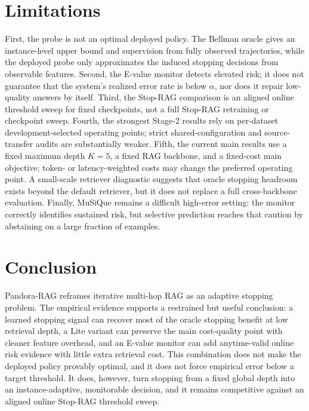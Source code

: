 \documentclass{article}
\newcommand{\method}{Pandora-RAG}
\newcommand{\musique}{MuSiQue}
\begin{document}
\section{Limitations}
\label{sec:limitations}

First, the probe is not an optimal deployed policy. The Bellman oracle gives an instance-level upper bound and supervision from fully observed trajectories, while the deployed probe only approximates the induced stopping decisions from observable features. Second, the E-value monitor detects elevated risk; it does not guarantee that the system's realized error rate is below $\alpha$, nor does it repair low-quality answers by itself. Third, the Stop-RAG comparison is an aligned online threshold sweep for fixed checkpoints, not a full Stop-RAG retraining or checkpoint sweep. Fourth, the strongest Stage-2 results rely on per-dataset development-selected operating points; strict shared-configuration and source-transfer audits are substantially weaker. Fifth, the current main results use a fixed maximum depth $K=5$, a fixed RAG backbone, and a fixed-cost main objective; token- or latency-weighted costs may change the preferred operating point. A small-scale retriever diagnostic suggests that oracle stopping headroom exists beyond the default retriever, but it does not replace a full cross-backbone evaluation. Finally, \musique{} remains a difficult high-error setting: the monitor correctly identifies sustained risk, but selective prediction reaches that caution by abstaining on a large fraction of examples.

\section{Conclusion}
\label{sec:conclusion}

\method{} reframes iterative multi-hop RAG as an adaptive stopping problem. The empirical evidence supports a restrained but useful conclusion: a learned stopping signal can recover most of the oracle stopping benefit at low retrieval depth, a Lite variant can preserve the main cost-quality point with cleaner feature overhead, and an E-value monitor can add anytime-valid online risk evidence with little extra retrieval cost. This combination does not make the deployed policy provably optimal, and it does not force empirical error below a target threshold. It does, however, turn stopping from a fixed global depth into an instance-adaptive, monitorable decision, and it remains competitive against an aligned online Stop-RAG threshold sweep.

\end{document}
